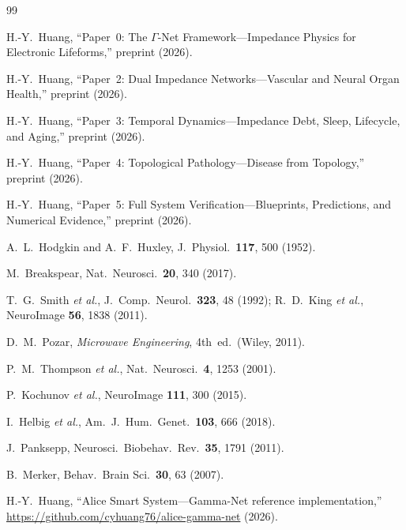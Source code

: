 \documentclass[aps,pre,twocolumn,superscriptaddress,floatfix]{revtex4-2}
\begin{document}
\begin{thebibliography}{99}

H.-Y.~Huang,
``Paper~0: The $\Gamma$-Net Framework---Impedance Physics
for Electronic Lifeforms,''
preprint (2026).

H.-Y.~Huang,
``Paper~2: Dual Impedance Networks---Vascular and Neural
Organ Health,''
preprint (2026).

H.-Y.~Huang,
``Paper~3: Temporal Dynamics---Impedance Debt, Sleep,
Lifecycle, and Aging,''
preprint (2026).

H.-Y.~Huang,
``Paper~4: Topological Pathology---Disease from Topology,''
preprint (2026).

H.-Y.~Huang,
``Paper~5: Full System Verification---Blueprints,
Predictions, and Numerical Evidence,''
preprint (2026).

A.~L.~Hodgkin and A.~F.~Huxley,
J.~Physiol.\ \textbf{117}, 500 (1952).

M.~Breakspear,
Nat.\ Neurosci.\ \textbf{20}, 340 (2017).

T.~G.~Smith \textit{et al.},
J.~Comp.\ Neurol.\ \textbf{323}, 48 (1992);
R.~D.~King \textit{et al.},
NeuroImage \textbf{56}, 1838 (2011).

D.~M.~Pozar, \emph{Microwave Engineering}, 4th~ed.\
(Wiley, 2011).

P.~M.~Thompson \textit{et al.},
Nat.\ Neurosci.\ \textbf{4}, 1253 (2001).

P.~Kochunov \textit{et al.},
NeuroImage \textbf{111}, 300 (2015).

I.~Helbig \textit{et al.},
Am.\ J.\ Hum.\ Genet.\ \textbf{103}, 666 (2018).

J.~Panksepp,
Neurosci.\ Biobehav.\ Rev.\ \textbf{35}, 1791 (2011).

B.~Merker,
Behav.\ Brain Sci.\ \textbf{30}, 63 (2007).

H.-Y.~Huang,
``Alice Smart System---Gamma-Net reference implementation,''
\url{https://github.com/cyhuang76/alice-gamma-net} (2026).

\end{thebibliography}
\end{document}
